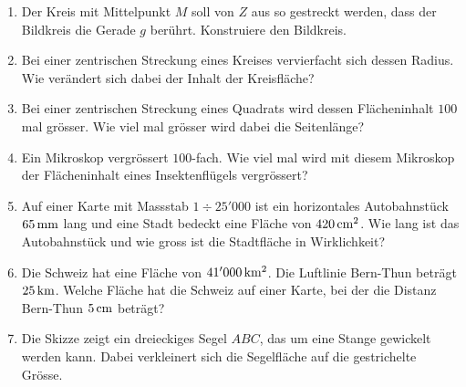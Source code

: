 \documentclass[%
11pt,%
twoside,%
titlepage,%
german,%
headsepline%
]{scrartcl}
\begin{document}
\begin{enumerate}
\item Der Kreis mit Mittelpunkt $M$ soll von $Z$ aus so gestreckt werden, dass der Bildkreis die Gerade $g$ ber\"uhrt. Konstruiere den Bildkreis.
\begin{center}
\end{center}
\item Bei einer zentrischen Streckung eines Kreises vervierfacht sich dessen Radius. Wie ver\"andert sich dabei der Inhalt der Kreisfl\"ache?
\item Bei einer zentrischen Streckung eines Quadrats wird dessen Fl\"acheninhalt $100$ mal gr\"osser. Wie viel mal gr\"osser wird dabei die Seitenl\"ange?
\item Ein Mikroskop vergr\"ossert $100$-fach. Wie viel mal wird mit diesem Mikroskop der Fl\"acheninhalt eines Insektenfl\"ugels vergr\"ossert?
\item Auf einer Karte mit Massstab $1\div25'000$ ist ein horizontales Autobahnst\"uck $\unit[65]{mm}$ lang und eine Stadt bedeckt eine Fl\"ache von $\unit[420]{cm^2}$. Wie lang ist das Autobahnst\"uck und wie gross ist die Stadtfl\"ache in Wirklichkeit?
\item Die Schweiz hat eine Fl\"ache von $\unit[41'000]{km^2}$. Die Luftlinie Bern-Thun betr\"agt $\unit[25]{km}$. Welche Fl\"ache hat die Schweiz auf einer Karte, bei der die Distanz Bern-Thun $\unit[5]{cm}$ betr\"agt?
\item Die Skizze zeigt ein dreieckiges Segel $ABC$, das um eine Stange gewickelt werden kann. Dabei verkleinert sich die Segelfl\"ache auf die gestrichelte Gr\"osse.
\begin{center}
\end{center}
\end{enumerate}
\end{document}
